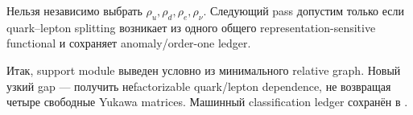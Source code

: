 \begin{nogocriterion}
Нельзя независимо выбрать \(\rho_u,\rho_d,\rho_e,\rho_\nu\). Следующий pass
допустим только если quark--lepton splitting возникает из одного общего
representation-sensitive functional и сохраняет anomaly/order-one ledger.
\end{nogocriterion}

Итак, support module выведен условно из минимального relative graph. Новый
узкий gap --- получить неfactorizable quark/lepton dependence, не возвращая
четыре свободные Yukawa matrices. Машинный classification ledger сохранён в
.